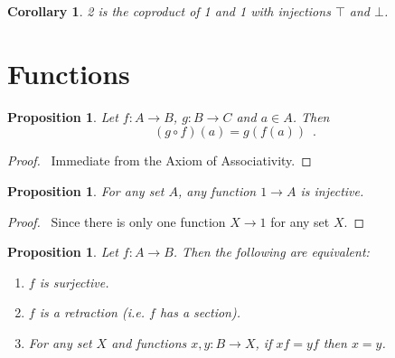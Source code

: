 \documentclass{book}
\let\qed\relax
\newtheorem{prop}[ax]{Proposition}
\newtheorem{cor}{Corollary}[ax]
\theoremstyle{definition}
\begin{document}
\begin{cor}
2 is the coproduct of 1 and 1 with injections $\top$ and $\bot$.
\end{cor}

\section{Functions}

\begin{prop}
Let $f : A \rightarrow B$, $g : B \rightarrow C$ and $a \in A$. Then
\[ (g \circ f)(a) = g(f(a)) \enspace . \]
\end{prop}

\begin{proof}
\pf\ Immediate from the Axiom of Associativity. \qed
\end{proof}

\begin{prop}
For any set $A$, any function $1 \rightarrow A$ is injective.
\end{prop}

\begin{proof}
\pf\ Since there is only one function $X \rightarrow 1$ for any set $X$. \qed
\end{proof}

\begin{prop}
Let $f : A \rightarrow B$. Then the following are equivalent:
\begin{enumerate}
\item $f$ is surjective.
\item $f$ is a retraction (i.e. $f$ has a section).
\item For any set $X$ and functions $x,y : B \rightarrow X$, if $xf = yf$ then $x = y$.
\end{enumerate}
\end{prop}
\end{document}
